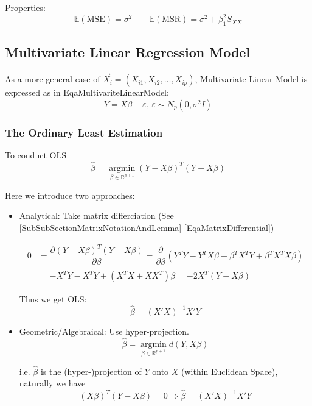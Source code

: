 Properties:
\begin{equation}
    \mathbb{E}(\mathrm{MSE})=\sigma ^2\qquad \mathbb{E}(\mathrm{MSR})=\sigma ^2+\beta _1^2S_{XX} 
\end{equation}



\subsection{Multivariate Linear Regression Model}\label{SubSectionMultivariateLinearRegressionModel}
    As a more general case of $ \vec{X}_i=(X_{i1},X_{i2},\ldots,X_{ip})  $, Multivariate Linear Model is expressed as in {EqaMultivariteLinearModel}:
    \begin{equation}
        Y=X\beta +\varepsilon ,\,\varepsilon \sim N_p(0,\sigma ^2I) 
    \end{equation}


\subsubsection{The Ordinary Least Estimation}
    To conduct OLS
    \begin{equation}
        \hat{\beta }=\mathop{ \arg\min }\limits_{\beta \in \mathbb{R}^{p+1} } (Y-X\beta )^T(Y-X\beta )
    \end{equation}
    
    Here we introduce two approaches:
\begin{itemize}[topsep=2pt,itemsep=2pt]
    \item Analytical: Take matrix differciation (See \autoref{SubSubSectionMatrixNotationAndLemma} \autoref{EqaMatrixDifferential})
    
   

\begin{align*}
    0&=\dfrac{\partial^{} (Y-X\beta )^T(Y-X\beta ) }{\partial \beta ^{}} =\dfrac{\partial^{} }{\partial\beta  ^{}}(Y^TY- Y^TX\beta -\beta ^TX^TY+\beta ^TX^TX\beta )\\ 
    &=-X^TY-X^TY+(X^TX+XX^T)\beta 
    =-2X^T(Y-X\beta )
\end{align*}
    
    Thus we get OLS:
    \begin{equation}
        \hat{\beta }=(X'X)^{-1}X'Y 
    \end{equation}
    
    
    \item Geometric/Algebraical: Use hyper-projection.
    \begin{equation}
        \hat{\beta }=\mathop{ \arg\min }\limits_{\beta \in \mathbb{R}^{p+1} } d(Y,X\beta )
    \end{equation}

    i.e. $ \hat{\beta } $ is the (hyper-)projection of $ Y $ onto $ X $ (within Euclidean Space), naturally we have
    \begin{equation}
        (X\beta )^T(Y-X\beta )=0\Rightarrow \hat{\beta }=(X'X)^{-1}X'Y 
    \end{equation}

\end{itemize}

